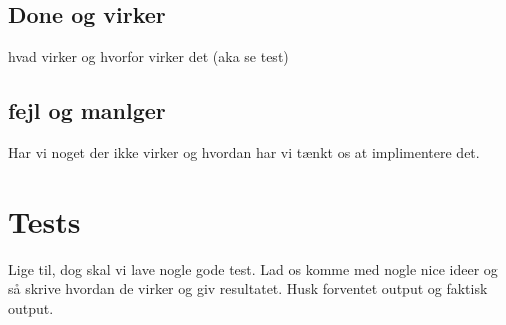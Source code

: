 \documentclass[11pt,twoside,a4paper]{article}
\begin{document}
\subsection{Done og virker}
hvad virker og hvorfor virker det (aka se test)

\subsection{fejl og manlger}
Har vi noget der ikke virker og hvordan har vi tænkt os at implimentere det.

\newpage
\pagestyle{fancy}
\section{Tests}
Lige til, dog skal vi lave nogle gode test. Lad os komme med nogle nice ideer og så skrive hvordan de virker og giv resultatet. Husk forventet output og faktisk output.
\end{document}
